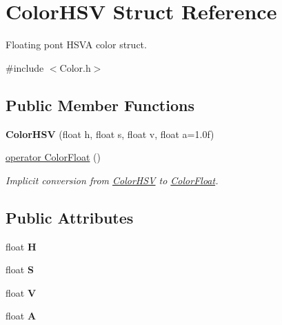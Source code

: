 \hypertarget{struct_color_h_s_v}{\section{Color\+H\+S\+V Struct Reference}
\label{struct_color_h_s_v}
}


Floating pont H\+S\+V\+A color struct.  




{\ttfamily \#include $<$Color.\+h$>$}

\subsection*{Public Member Functions}
\begin{DoxyCompactItemize}
\item 
\hypertarget{struct_color_h_s_v_ab5add9e01e8d363874bcba5c7908e4bf}{{\bfseries Color\+H\+S\+V} (float h, float s, float v, float a=1.\+0f)}\label{struct_color_h_s_v_ab5add9e01e8d363874bcba5c7908e4bf}

\item 
\hyperlink{struct_color_h_s_v_a7a528f702f78a761a852459865d0f315}{operator Color\+Float} ()
\begin{DoxyCompactList}\small\item\em Implicit conversion from \hyperlink{struct_color_h_s_v}{Color\+H\+S\+V} to \hyperlink{struct_color_float}{Color\+Float}. \end{DoxyCompactList}\end{DoxyCompactItemize}
\subsection*{Public Attributes}
\begin{DoxyCompactItemize}
\item 
\hypertarget{struct_color_h_s_v_aa89f54beecbbbfc1aa2fc052841df10a}{float {\bfseries H}}\label{struct_color_h_s_v_aa89f54beecbbbfc1aa2fc052841df10a}

\item 
\hypertarget{struct_color_h_s_v_a3b1b00fc23b90d9dd708ae34225b9b27}{float {\bfseries S}}\label{struct_color_h_s_v_a3b1b00fc23b90d9dd708ae34225b9b27}

\item 
\hypertarget{struct_color_h_s_v_aeb5ccdbb997f9988b57dc17e92c5e08a}{float {\bfseries V}}\label{struct_color_h_s_v_aeb5ccdbb997f9988b57dc17e92c5e08a}

\item 
\hypertarget{struct_color_h_s_v_a64e94b0c42d2d328fd720dd3b0e60860}{float {\bfseries A}}\label{struct_color_h_s_v_a64e94b0c42d2d328fd720dd3b0e60860}

\end{DoxyCompactItemize}


